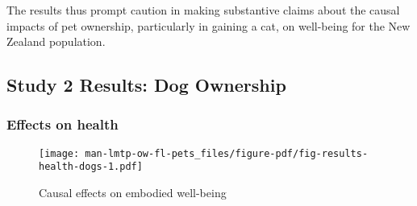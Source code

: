 \documentclass[
  singlecolumn,
  9pt]{article}
\begin{document}
The results thus prompt caution in making substantive claims about the
causal impacts of pet ownership, particularly in gaining a cat, on
well-being for the New Zealand population.

\newpage{}

\subsection{Study 2 Results: Dog
Ownership}\label{study-2-results-dog-ownership}

\subsubsection{Effects on health}\label{effects-on-health-1}

\begin{figure}

{\centering \texttt{[image: man-lmtp-ow-fl-pets\_files/figure-pdf/fig-results-health-dogs-1.pdf]}

}

\caption{\label{fig-results-health-dogs}Causal effects on embodied
well-being}

\end{figure}

\newpage{}
\end{document}

